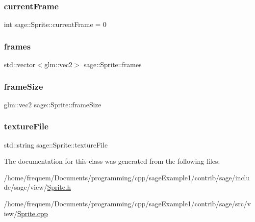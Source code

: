 \subsubsection{\texorpdfstring{currentFrame}{currentFrame}}
{\footnotesize\ttfamily int sage\+::\+Sprite\+::current\+Frame = 0\hspace{0.3cm}{\ttfamily [private]}}

\mbox{\label{classsage_1_1Sprite_ad6aa87dfe1f1ce53e2de2df0aa10f229}} 
\subsubsection{\texorpdfstring{frames}{frames}}
{\footnotesize\ttfamily std\+::vector$<$glm\+::vec2$>$ sage\+::\+Sprite\+::frames\hspace{0.3cm}{\ttfamily [private]}}

\mbox{\label{classsage_1_1Sprite_ae6d6160fb0c882acd8b786d2353208e6}} 
\subsubsection{\texorpdfstring{frameSize}{frameSize}}
{\footnotesize\ttfamily glm\+::vec2 sage\+::\+Sprite\+::frame\+Size\hspace{0.3cm}{\ttfamily [private]}}

\mbox{\label{classsage_1_1Sprite_a3ad65ff16f4f98a15f52092b1542838b}} 
\subsubsection{\texorpdfstring{textureFile}{textureFile}}
{\footnotesize\ttfamily std\+::string sage\+::\+Sprite\+::texture\+File\hspace{0.3cm}{\ttfamily [private]}}



The documentation for this class was generated from the following files\+:\begin{DoxyCompactItemize}
\item 
/home/frequem/\+Documents/programming/cpp/sage\+Example1/contrib/sage/include/sage/view/\mbox{\hyperlink{Sprite_8h}{Sprite.\+h}}\item 
/home/frequem/\+Documents/programming/cpp/sage\+Example1/contrib/sage/src/view/\mbox{\hyperlink{Sprite_8cpp}{Sprite.\+cpp}}\end{DoxyCompactItemize}
